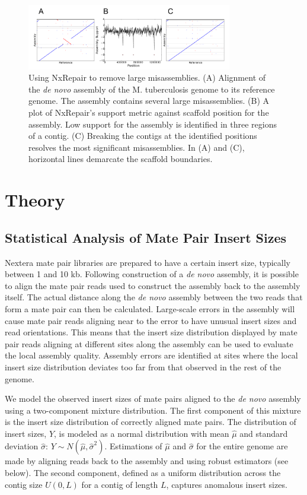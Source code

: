 \begin{figure}
\centerline{\includegraphics[width=0.8\textwidth]{illumina/fig1_nxrepair.pdf}}
\caption{Using NxRepair to remove large misassemblies. (A) Alignment of the \textit{de novo} assembly of the M. tuberculosis genome to its reference genome. The assembly contains several large misassemblies. (B) A plot of NxRepair's support metric against scaffold position for the assembly. Low support for the assembly is identified in three regions of a contig. (C) Breaking the contigs at the identified positions resolves the most significant misassemblies. In (A) and (C), horizontal lines demarcate the scaffold boundaries.}\label{fig:NxRepair}
\end{figure}

\clearpage

\section{Theory}
\subsection{Statistical Analysis of Mate Pair Insert Sizes}
\label{sect:illumina_theory}
Nextera mate pair libraries are prepared to have a certain insert size, typically between 1 and 10 kb. Following construction of a \textit{de novo} assembly, it is possible to align the mate pair reads used to construct the assembly back to the assembly itself. The actual distance along the \textit{de novo} assembly between the two reads that form a mate pair can then be calculated. Large-scale errors in the assembly will cause mate pair reads aligning near to the error to have unusual insert sizes and read orientations. This means that the insert size distribution displayed by mate pair reads aligning at different sites along the assembly can be used to evaluate the local assembly quality. Assembly errors are identified at sites where the local insert size distribution deviates too far from that observed in the rest of the genome.       

We model the observed insert sizes of mate pairs aligned to the \textit{de novo} assembly using a two-component mixture distribution. The first component of this mixture is the insert size distribution of correctly aligned mate pairs.  The distribution of insert sizes, $Y$, is modeled as a normal distribution with mean $\hat{\mu}$ and standard deviation $\hat{\sigma}$: $Y \sim N(\hat{\mu},\hat{\sigma}^2).$ Estimations of $\hat{\mu}$ and $\hat{\sigma}$ for the entire genome are made by aligning reads back to the assembly and using robust estimators (see below). The second component, defined as a uniform distribution across the contig size $U(0,L)$ for a contig of length $L$, captures anomalous insert sizes. 

